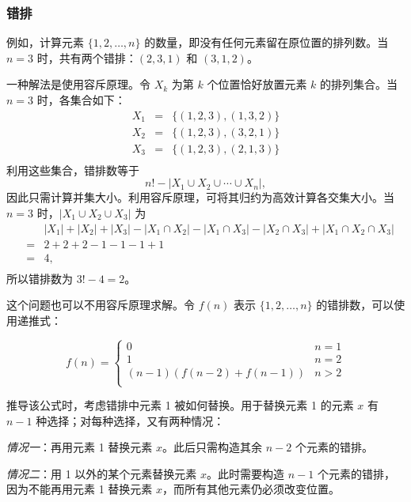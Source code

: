 \subsubsection{错排}


例如，计算元素 $\{1,2,\ldots,n\}$ 的数量，即没有任何元素留在原位置的排列数。当 $n=3$ 时，共有两个错排：$(2,3,1)$ 和 $(3,1,2)$。

一种解法是使用容斥原理。令 $X_k$ 为第 $k$ 个位置恰好放置元素 $k$ 的排列集合。当 $n=3$ 时，各集合如下：
\[
\begin{array}{lcl}
X_1 & = & \{(1,2,3),(1,3,2)\} \\
X_2 & = & \{(1,2,3),(3,2,1)\} \\
X_3 & = & \{(1,2,3),(2,1,3)\} \\
\end{array}
\]
利用这些集合，错排数等于
\[ n! - |X_1 \cup X_2 \cup \cdots \cup X_n|, \]
因此只需计算并集大小。利用容斥原理，可将其归约为高效计算各交集大小。当 $n=3$ 时，$|X_1 \cup X_2 \cup X_3|$ 为
\[
\begin{array}{lcl}
 & & |X_1| + |X_2| + |X_3| - |X_1 \cap X_2|  - |X_1 \cap X_3|  - |X_2 \cap X_3| + |X_1 \cap X_2 \cap X_3| \\
 & = & 2+2+2-1-1-1+1 \\
 & = & 4, \\
\end{array}
\]
所以错排数为 $3!-4=2$。

这个问题也可以不用容斥原理求解。令 $f(n)$ 表示 $\{1,2,\ldots,n\}$ 的错排数，可以使用递推式：

\begin{equation*}
    f(n) = \begin{cases}
               0               & n = 1\\
               1               & n = 2\\
               (n-1)(f(n-2) + f(n-1)) & n>2 \\
           \end{cases}
\end{equation*}

推导该公式时，考虑错排中元素 1 被如何替换。用于替换元素 1 的元素 $x$ 有 $n-1$ 种选择；对每种选择，又有两种情况：

\textit{情况一}：再用元素 1 替换元素 $x$。此后只需构造其余 $n-2$ 个元素的错排。

\textit{情况二}：用 1 以外的某个元素替换元素 $x$。此时需要构造 $n-1$ 个元素的错排，因为不能再用元素 1 替换元素 $x$，而所有其他元素仍必须改变位置。

